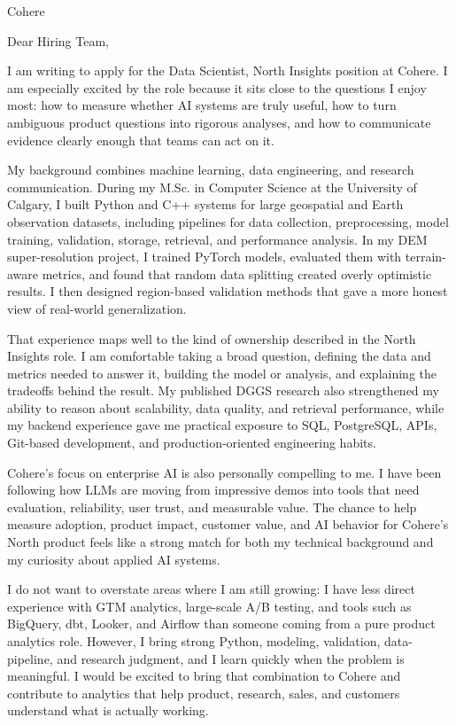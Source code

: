 \documentclass[11pt]{letter}
\begin{document}
\begin{letter}{Cohere}

\opening{Dear Hiring Team,}

I am writing to apply for the Data Scientist, North Insights position at Cohere. I am especially excited by the role because it sits close to the questions I enjoy most: how to measure whether AI systems are truly useful, how to turn ambiguous product questions into rigorous analyses, and how to communicate evidence clearly enough that teams can act on it.

My background combines machine learning, data engineering, and research communication. During my M.Sc. in Computer Science at the University of Calgary, I built Python and C++ systems for large geospatial and Earth observation datasets, including pipelines for data collection, preprocessing, model training, validation, storage, retrieval, and performance analysis. In my DEM super-resolution project, I trained PyTorch models, evaluated them with terrain-aware metrics, and found that random data splitting created overly optimistic results. I then designed region-based validation methods that gave a more honest view of real-world generalization.

That experience maps well to the kind of ownership described in the North Insights role. I am comfortable taking a broad question, defining the data and metrics needed to answer it, building the model or analysis, and explaining the tradeoffs behind the result. My published DGGS research also strengthened my ability to reason about scalability, data quality, and retrieval performance, while my backend experience gave me practical exposure to SQL, PostgreSQL, APIs, Git-based development, and production-oriented engineering habits.

Cohere's focus on enterprise AI is also personally compelling to me. I have been following how LLMs are moving from impressive demos into tools that need evaluation, reliability, user trust, and measurable value. The chance to help measure adoption, product impact, customer value, and AI behavior for Cohere's North product feels like a strong match for both my technical background and my curiosity about applied AI systems.

I do not want to overstate areas where I am still growing: I have less direct experience with GTM analytics, large-scale A/B testing, and tools such as BigQuery, dbt, Looker, and Airflow than someone coming from a pure product analytics role. However, I bring strong Python, modeling, validation, data-pipeline, and research judgment, and I learn quickly when the problem is meaningful. I would be excited to bring that combination to Cohere and contribute to analytics that help product, research, sales, and customers understand what is actually working.


\end{letter}
\end{document}
